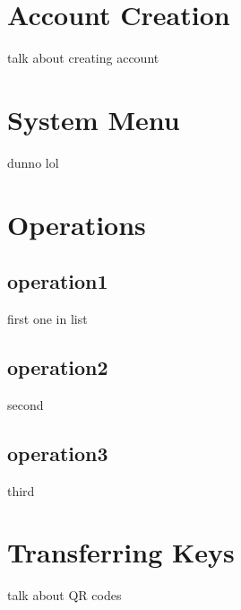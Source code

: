 \section{Account Creation}
talk about creating account
\section{System Menu}
dunno lol
\section{Operations}
\subsection{operation1}
first one in list
\subsection{operation2}
second
\subsection{operation3}
third
\section{Transferring Keys}
talk about QR codes